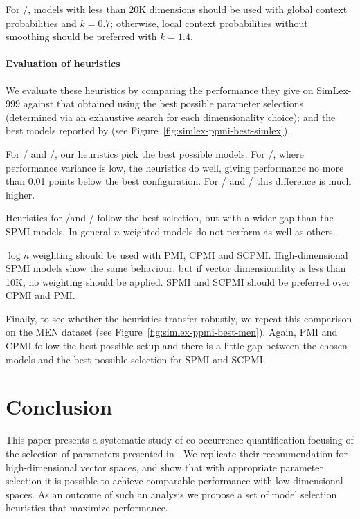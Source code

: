 \documentclass[11pt]{article}
\begin{document}
For \logNSCPMI/, models with less than 20K dimensions should be used with global context probabilities and $k = 0.7$; otherwise, local context probabilities without smoothing should be preferred with $k = 1.4$.

\paragraph{Evaluation of heuristics}
\label{sec:heuristic-evaluation}

We evaluate these heuristics by comparing the performance they give on SimLex-999 against that obtained using the best possible parameter selections (determined via an exhaustive search for each dimensionality choice); and the best models reported by \cite{TACL570} (see Figure~\ref{fig:simlex-ppmi-best-simlex}).

For \logNPMI/ and \logNCPMI/, our heuristics pick the best possible models. For \logNSPMI/, where performance variance is low, the heuristics do well, giving performance no more than 0.01 points below the best configuration. For \SPMI/ and \NSPMI/ this difference is much higher. 

Heuristics for \logNSCPMI/and \SCPMI/ follow the best selection, but with a wider gap than the SPMI models. In general $n$ weighted models do not perform as well as others. 

$\log n$ weighting should be used with PMI, CPMI and SCPMI. High-dimensional SPMI models show the same behaviour, but if vector dimensionality is less than 10K, no weighting should be applied. SPMI and SCPMI should be preferred over CPMI and PMI.

Finally, to see whether the heuristics transfer robustly, we repeat this comparison on the MEN dataset (see Figure~\ref{fig:simlex-ppmi-best-men}). Again, PMI and CPMI follow the best possible setup and there is a little gap between the chosen models and the best possible selection for SPMI and SCPMI.


\section{Conclusion}
\label{sec:conclusion}

This paper presents a systematic study of co-occurrence quantification focusing of the selection of parameters presented in . We replicate their recommendation for high-dimensional vector spaces, and show that with appropriate parameter selection it is possible to achieve comparable performance with low-dimensional spaces. As an outcome of such an analysis we propose a set of model selection heuristics that maximize performance.
\end{document}
